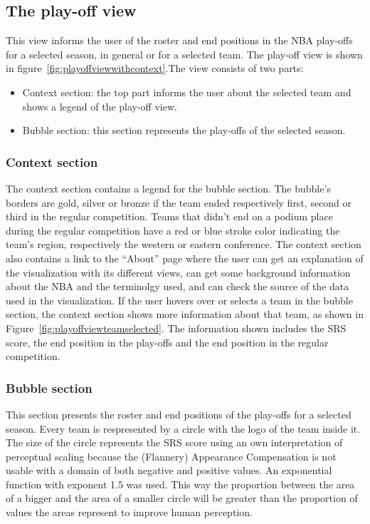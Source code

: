 \documentclass[]{sigchi}
\begin{document}
\subsection{The play-off view}
This view informs the user of the roster and end positions in the NBA play-offs
for a selected season, in general or for a selected team. The play-off view is 
shown in figure~\ref{fig:playoffviewwithcontext}.The view consists of
two parts: 
\begin{itemize}
    \item Context section: the top part informs the user about the selected team
    and shows a legend of the play-off view.
    \item Bubble section: this section represents the play-offs of the selected
    season.
\end{itemize}

\subsubsection{Context section}
The context section contains a legend for the bubble section. The bubble's
borders are gold, silver or bronze if the team ended respectively first, second
or third in the regular competition. Teams that didn't end on a podium place
during the regular competition have a red or blue stroke color indicating the
team's region, respectively the western or eastern conference. The context
section also contains a link to the ``About'' page where the user can get an
explanation of the visualization with its different views, can get some
background information about the NBA and the terminolgy used, and can check the
source of the data used in the visualization. If the user hovers over or selects 
a team in the bubble section, the context section shows more information about that 
team, as shown in Figure~\ref{fig:playoffviewteamselected}. The information shown 
includes the SRS score, the end position in the play-offs and the end position in 
the regular competition.

\subsubsection{Bubble section}
This section presents the roster and end positions of the play-offs for a
selected season. Every team is respresented by a circle with the logo of the
team inside it. The size of the circle represents the SRS score using an own
interpretation of perceptual scaling because the (Flannery) Appearance
Compensation is not usable with a domain of both negative and positive values.
An exponential function with exponent 1.5 was used. This way the proportion
between the area of a bigger and the area of a smaller circle will be greater
than the proportion of values the areas represent to improve human perception.
\end{document}
